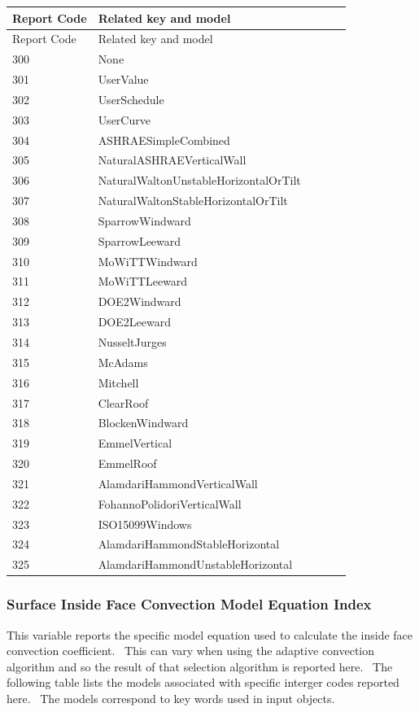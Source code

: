 \begin{longtable}[c]{@{}ll@{}}
\toprule 
Report Code & Related key and model \tabularnewline
\midrule
\endfirsthead

\toprule 
Report Code & Related key and model \tabularnewline
\midrule
\endhead

300 & None~ \tabularnewline
301 & UserValue \tabularnewline
302 & UserSchedule \tabularnewline
303 & UserCurve~~~~~~~~~~~~~~~~~~~~~~~~~~~~~~ \tabularnewline
304 & ASHRAESimpleCombined~~~~~~~~~~~~~~~~~~~ \tabularnewline
305 & NaturalASHRAEVerticalWall~~~~~~~~~~~~~~ \tabularnewline
306 & NaturalWaltonUnstableHorizontalOrTilt~~ \tabularnewline
307 & NaturalWaltonStableHorizontalOrTilt~~~~ \tabularnewline
308 & SparrowWindward~~~~~~~~~~~~~~~~~~~~~~~~ \tabularnewline
309 & SparrowLeeward~~~~~~~~~~~~~~~~~~~~~~~~~ \tabularnewline
310 & MoWiTTWindward~~~~~~~~~~~~~~~~~~~~~~~~~ \tabularnewline
311 & MoWiTTLeeward~~~~~~~~~~~~~~~~~~~~~~~~~~ \tabularnewline
312 & DOE2Windward~~~~~~~~~~~~~~~~~~~~~~~~~~~ \tabularnewline
313 & DOE2Leeward~~~~~~~~~~~~~~~~~~~~~~~~~~~~ \tabularnewline
314 & NusseltJurges~~~~~~~~~~~~~~~~~~~~~~~~~~ \tabularnewline
315 & McAdams~~~~~~~~~~~~~~~~~~~~~~~~~~~~~~~~ \tabularnewline
316 & Mitchell~~~~~~~~~~~~~~~~~~~~~~~~~~~~~~~ \tabularnewline
317 & ClearRoof~~~~~~~~~~~~~~~~~~~~~~~~~~~~~~ \tabularnewline
318 & BlockenWindward~~~~~~~~~~~~~~~~~~~~~~~~ \tabularnewline
319 & EmmelVertical~~~~~~~~~~~~ ~~~~~~~~~~~~~~ \tabularnewline
320 & EmmelRoof~~~~~~~~~~~~~~~~~~~~~~~~~~~~~~ \tabularnewline
321 & AlamdariHammondVerticalWall~~~~~~~~~~~~ \tabularnewline
322 & FohannoPolidoriVerticalWall~~~~~~~~~~~~ \tabularnewline
323 & ISO15099Windows~~~~~~~~~~~~~~~~~~~~~~~~ \tabularnewline
324 & AlamdariHammondStableHorizontal~~~~~~~~ \tabularnewline
325 & AlamdariHammondUnstableHorizontal~~~~~~ \tabularnewline
\bottomrule
\end{longtable}

\subsubsection{Surface Inside Face Convection Model Equation Index}\label{surface-inside-face-convection-model-equation-index}

This variable reports the specific model equation used to calculate the inside face convection coefficient.~ This can vary when using the adaptive convection algorithm and so the result of that selection algorithm is reported here.~ The following table lists the models associated with specific interger codes reported here.~ The models correspond to key words used in input objects.

